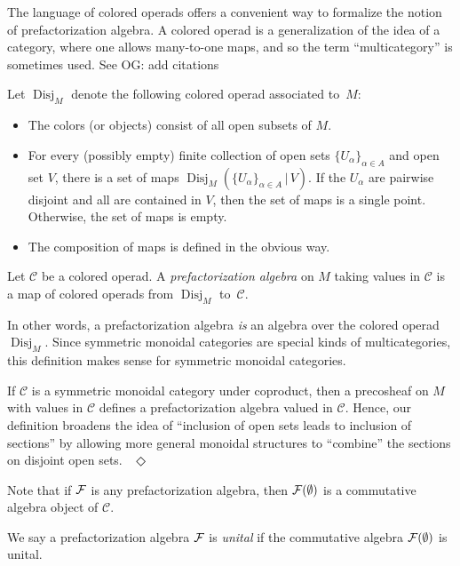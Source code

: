 \documentclass[11pt]{amsart}
\def\mc{\mathcal}
\def\mcol{\, | \,}
\def\Disj{\operatorname{Disj}}
\def\owen#1{{\textcolor{violet!65!black}{OG: {#1}}}}
\begin{document}
The language of colored operads offers a convenient way to formalize the notion of prefactorization algebra.
A colored operad is a generalization of the idea of a category, where one allows many-to-one maps, and so the term ``multicategory'' is sometimes used. 
See \owen{add citations}

\begin{dfn}
Let $\Disj_M$ denote the following colored operad associated to~$M$: 
\begin{itemize}
\item The colors (or objects) consist of all open subsets of $M$. 
\item For every (possibly empty) finite collection of open sets $\{U_\alpha\}_{\alpha \in A}$ and open set $V$, there is a set of maps $\Disj_M( \{U_\alpha\}_{\alpha \in A} \mcol V)$. If the $U_\alpha$ are pairwise disjoint and all are contained in $V$, then the set of maps is a single point. Otherwise, the set of maps is empty.
\item The composition of maps is defined in the obvious way. 
\end{itemize}
\end{dfn}

\begin{dfn}
Let $\mc{C}$ be a colored operad. 
A \emph{prefactorization algebra}  on $M$ taking values in $\mc{C}$ is a map of colored operads from $\Disj_M$ to~$\mc{C}$. 
\end{dfn}

In other words, a prefactorization algebra \emph{is} an algebra over the colored operad $\Disj_M$.
Since symmetric monoidal categories are special kinds of multicategories, this definition makes sense for symmetric monoidal categories. 

\begin{rmk} 
If $\mc{C}$ is a symmetric monoidal category under coproduct, then a precosheaf on $M$ with values in $\mc{C}$ defines a prefactorization algebra valued in $\mc{C}$. 
Hence, our definition broadens the idea of ``inclusion of open sets leads to inclusion of sections'' by allowing more general monoidal structures to ``combine'' the sections on disjoint open sets.
~\hfill$\Diamond$ 
\end{rmk}

Note that if $\mathcal F$ is any prefactorization algebra, then $\mathcal F(\emptyset)$ is a commutative algebra object of $\mc{C}$. 

\begin{dfn}
We say a prefactorization algebra $\mathcal F$ is \emph{unital} if the commutative algebra $\mathcal F(\emptyset)$ is unital. 
\end{dfn}
\end{document}
